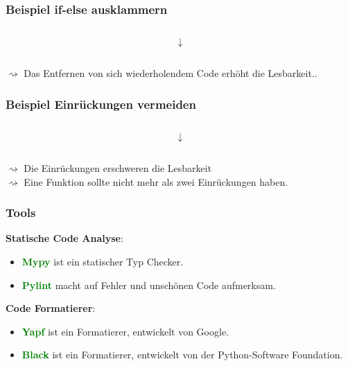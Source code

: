 \documentclass[10pt]{beamer}
\newcommand{\htgreen}[1] {{\bf \textcolor{Green}{#1}}}
\begin{document}
\begin{frame}
  \frametitle{Beispiel if-else ausklammern}
  \begin{figure}[thp]
  \centering 
  \begin{minipage}{0.4\textwidth}
  \inputminted{python}{duplication_bad.py}
  \end{minipage}
  \end{figure}
  \[\downarrow\]
  \begin{figure}[thp]
  \centering 
  \begin{minipage}{0.4\textwidth}
  \inputminted{python}{duplication_good.py}
  \end{minipage}
  \end{figure}
  \vspace*{0.5cm}
  $\rightsquigarrow$ Das Entfernen von sich wiederholendem Code erhöht die Lesbarkeit..\\
\end{frame}

\begin{frame}
  \frametitle{Beispiel Einrückungen vermeiden}
  \begin{figure}[thp]
  \centering 
  \begin{minipage}{0.4\textwidth}
  \inputminted{python}{indent_bad.py}
  \end{minipage}
  \end{figure}
  \[\downarrow\]
  \begin{figure}[thp]
  \centering 
  \begin{minipage}{0.4\textwidth}
  \inputminted{python}{indent_good.py}
  \end{minipage}
  \end{figure}
  \vspace*{0.5cm}
  $\rightsquigarrow$ Die Einrückungen erschweren die Lesbarkeit\\
  $\rightsquigarrow$ Eine Funktion sollte nicht mehr als zwei Einrückungen haben.

\end{frame}

\begin{frame}
  \frametitle{Tools}
  {\bf Statische Code Analyse}:
  \begin{itemize}
    \item \htgreen{Mypy} ist ein statischer Typ Checker. 
    \item \htgreen{Pylint} macht auf Fehler und unschönen Code aufmerksam.
  \end{itemize}

  \vspace{0.5cm}

  {\bf Code Formatierer}:
  \begin{itemize}
    \item \htgreen{Yapf} ist ein Formatierer, entwickelt von Google.
    \item \htgreen{Black} ist ein Formatierer, entwickelt von der
        Python-Software Foundation.
  \end{itemize}
\end{frame}
\end{document}
